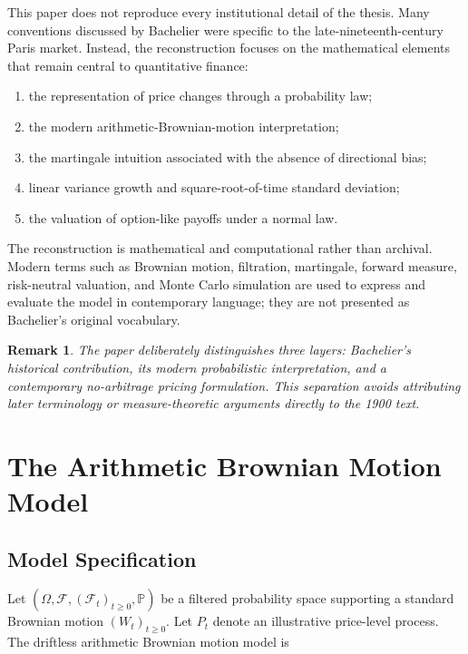 \documentclass[11pt,a4paper]{article}
\newtheorem{remark}{Remark}
\newcommand{\Prob}{\mathbb{P}}
\begin{document}
This paper does not reproduce every institutional detail of the thesis. Many conventions discussed by Bachelier were specific to the late-nineteenth-century Paris market. Instead, the reconstruction focuses on the mathematical elements that remain central to quantitative finance:

\begin{enumerate}[label=(\roman*), leftmargin=2.2em]
\item the representation of price changes through a probability law;
\item the modern arithmetic-Brownian-motion interpretation;
\item the martingale intuition associated with the absence of directional bias;
\item linear variance growth and square-root-of-time standard deviation;
\item the valuation of option-like payoffs under a normal law.
\end{enumerate}

The reconstruction is mathematical and computational rather than archival. Modern terms such as Brownian motion, filtration, martingale, forward measure, risk-neutral valuation, and Monte Carlo simulation are used to express and evaluate the model in contemporary language; they are not presented as Bachelier's original vocabulary.

\begin{remark}
The paper deliberately distinguishes three layers: Bachelier's historical contribution, its modern probabilistic interpretation, and a contemporary no-arbitrage pricing formulation. This separation avoids attributing later terminology or measure-theoretic arguments directly to the 1900 text.
\end{remark}

\section{The Arithmetic Brownian Motion Model}

\subsection{Model Specification}

Let \((\Omega,\mathcal{F},(\mathcal{F}_t)_{t\geq0},\Prob)\) be a filtered probability space supporting a standard Brownian motion \((W_t)_{t\geq0}\). Let \(P_t\) denote an illustrative price-level process. The driftless arithmetic Brownian motion model is
\end{document}
